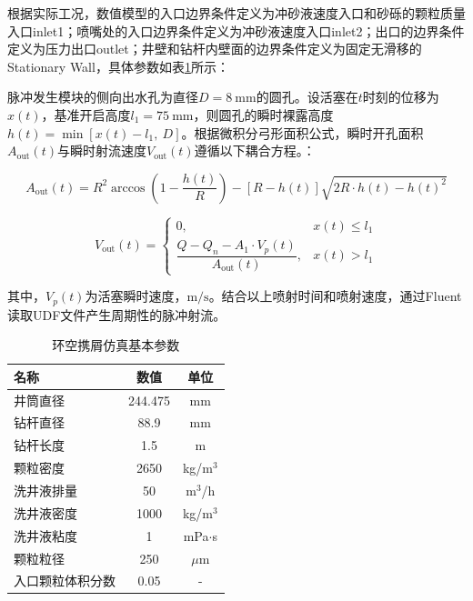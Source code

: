 根据实际工况，数值模型的入口边界条件定义为冲砂液速度入口和砂砾的颗粒质量入口inlet1；喷嘴处的入口边界条件定义为冲砂液速度入口inlet2；出口的边界条件定义为压力出口outlet；井壁和钻杆内壁面的边界条件定义为固定无滑移的Stationary Wall，具体参数如表\ref{tab:annulus_sand_simulation_params}所示：



脉冲发生模块的侧向出水孔为直径$D=8\ \mathrm{mm}$的圆孔。设活塞在$t$时刻的位移为$x(t)$，基准开启高度$l_1=75\ \mathrm{mm}$，则圆孔的瞬时裸露高度$h(t)=\min\left[x(t)-l_1,\ D\right]$。根据微积分弓形面积公式，瞬时开孔面积$A_{\mathrm{out}}(t)$与瞬时射流速度$V_{\mathrm{out}}(t)$遵循以下耦合方程。\cite{ref29}：

\begin{equation}
	A_{\mathrm{out}}(t)=R^{2}\arccos\left(1-\frac{h(t)}{R}\right)-\left[R-h(t)\right]\sqrt{2R\cdot h(t)-h(t)^{2}}
	\label{eq:open_area_segment}
\end{equation}

\begin{equation}
	V_{\mathrm{out}}(t)=
	\begin{cases}
		0, & x(t)\le l_1 \\[4pt]
		\dfrac{Q-Q_n-A_1\cdot V_p(t)}{A_{\mathrm{out}}(t)}, & x(t)>l_1
	\end{cases}
	\label{eq:vout_coupling}
\end{equation}

其中，$V_p(t)$为活塞瞬时速度，$\mathrm{m/s}$。结合以上喷射时间和喷射速度，通过Fluent读取UDF文件产生周期性的脉冲射流。
\begin{table}[htbp]
    \centering
    \caption{环空携屑仿真基本参数}
    \label{tab:annulus_sand_simulation_params}
    \renewcommand{\arraystretch}{1.5} %
    \begin{tabularx}{.9\textwidth}{Xcc}
        \toprule %
        名称 & 数值 & 单位 \\
        \midrule %
        井筒直径 & 244.475 & mm \\
        钻杆直径 & 88.9 & mm \\
        钻杆长度 & 1.5 & m \\
        颗粒密度 & 2650 & kg/m$^3$ \\
        洗井液排量 & 50 & m$^3$/h \\
        洗井液密度 & 1000 & kg/m$^3$ \\
        洗井液粘度 & 1 & mPa$\cdot$s \\
        颗粒粒径 & 250 & $\mu$m \\
        入口颗粒体积分数 & 0.05 & - \\
        \bottomrule %
    \end{tabularx}
\end{table}

